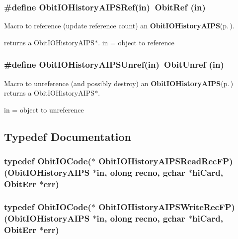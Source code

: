 \subsubsection{\setlength{\rightskip}{0pt plus 5cm}\#define Obit\-IOHistory\-AIPSRef(in)\ Obit\-Ref (in)}\label{ObitIOHistoryAIPS_8h_a1}


Macro to reference (update reference count) an {\bf Obit\-IOHistory\-AIPS}{\rm (p.\,\pageref{structObitIOHistoryAIPS})}. 

returns a Obit\-IOHistory\-AIPS$\ast$. in = object to reference 
\subsubsection{\setlength{\rightskip}{0pt plus 5cm}\#define Obit\-IOHistory\-AIPSUnref(in)\ Obit\-Unref (in)}\label{ObitIOHistoryAIPS_8h_a0}


Macro to unreference (and possibly destroy) an {\bf Obit\-IOHistory\-AIPS}{\rm (p.\,\pageref{structObitIOHistoryAIPS})} returns a Obit\-IOHistory\-AIPS$\ast$. 

in = object to unreference 

\subsection{Typedef Documentation}
\subsubsection{\setlength{\rightskip}{0pt plus 5cm}typedef Obit\-IOCode($\ast$ {\bf Obit\-IOHistory\-AIPSRead\-Rec\-FP})({\bf Obit\-IOHistory\-AIPS} $\ast$in, {\bf olong} recno, gchar $\ast$hi\-Card, {\bf Obit\-Err} $\ast$err)}\label{ObitIOHistoryAIPS_8h_a3}


\subsubsection{\setlength{\rightskip}{0pt plus 5cm}typedef Obit\-IOCode($\ast$ {\bf Obit\-IOHistory\-AIPSWrite\-Rec\-FP})({\bf Obit\-IOHistory\-AIPS} $\ast$in, {\bf olong} recno, gchar $\ast$hi\-Card, {\bf Obit\-Err} $\ast$err)}\label{ObitIOHistoryAIPS_8h_a4}




